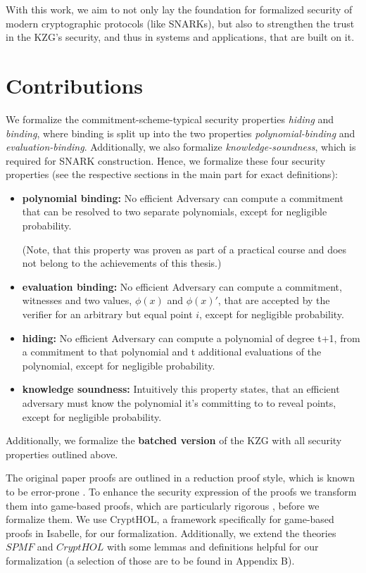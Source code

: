 With this work, we aim to not only lay the foundation for formalized security of modern cryptographic protocols (like SNARKs), but also to strengthen the trust in the KZG's security, and thus in systems and applications, that are built on it. 

\section*{Contributions}

We formalize the commitment-scheme-typical security properties \textit{hiding} and \textit{binding}, where binding is split up into the two properties \textit{polynomial-binding} and \textit{evaluation-binding}. Additionally, we also formalize \textit{knowledge-soundness}, which is required for SNARK construction. Hence, we formalize these four security properties (see the respective sections in the main part for exact definitions):
\begin{itemize}
    \item \textbf{polynomial binding:}
    No efficient Adversary can compute a commitment that can be resolved to two separate polynomials, except for negligible probability.

    (Note, that this property was proven as part of a practical course and does not belong to the achievements of this thesis.)
    \item \textbf{evaluation binding:}
    No efficient Adversary can compute a commitment, witnesses and two values, $\phi(x)$ and $\phi(x)'$, that are accepted by the verifier for an arbitrary but equal point $i$, except for negligible probability.
    \item \textbf{hiding:}
    No efficient Adversary can compute a polynomial of degree t+1, from a commitment to that polynomial and t additional evaluations of the polynomial, except for negligible probability.
    \item \textbf{knowledge soundness:}
    Intuitively this property states, that an efficient adversary must know the polynomial it's committing to to reveal points, except for negligible probability. 
\end{itemize} 
Additionally, we formalize the \textbf{batched version} of the KZG with all security properties outlined above.  

The original paper proofs are outlined in a reduction proof style, which is known to be error-prone \parencite{gamesB&R}. To enhance the security expression of the proofs we transform them into game-based proofs, which are particularly rigorous \parencite{shoup_games, gamesB&R}, before we formalize them. We use CryptHOL, a framework specifically for game-based proofs in Isabelle, for our formalization. 
Additionally, we extend the theories $SPMF$ and $CryptHOL$ with some lemmas and definitions helpful for our formalization (a selection of those are to be found in Appendix B).

